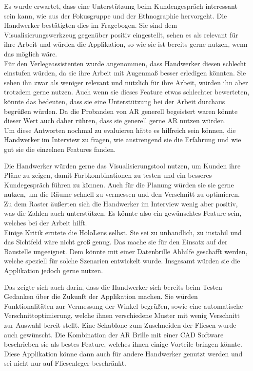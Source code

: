 Es wurde erwartet, dass eine Unterstützung beim Kundengespräch interessant sein kann, wie aus der Fokusgruppe und der Ethnographie hervorgeht. Die Handwerker bestätigten dies im Fragebogen. Sie sind dem Visualisierungswerkzeug gegenüber positiv eingestellt, sehen es als relevant für ihre Arbeit und würden die Applikation, so wie sie ist bereits gerne nutzen, wenn das möglich wäre. \\
Für den Verlegeassistenten wurde angenommen, dass Handwerker diesen schlecht einstufen würden, da sie ihre Arbeit mit Augenmaß besser erledigen könnten. Sie sehen ihn zwar als weniger relevant und nützlich für ihre Arbeit, würden ihn aber trotzdem gerne nutzen. Auch wenn sie dieses Feature etwas schlechter bewerteten, könnte das bedeuten, dass sie eine Unterstützung bei der Arbeit durchaus begrüßen würden. Da die Probanden von AR generell begeistert waren könnte dieser Wert auch daher rühren, dass sie generell gerne AR nutzen würden. \\
Um diese Antworten nochmal zu evaluieren hätte es hilfreich sein können, die Handwerker im Interview zu fragen, wie anstrengend sie die Erfahrung und wie gut sie die einzelnen Features fanden.

Die Handwerker würden gerne das Visualisierungstool nutzen, um Kunden ihre Pläne zu zeigen, damit Farbkombinationen zu testen und ein besseres Kundegespräch führen zu können. Auch für die Planung würden sie sie gerne nutzen, um die Räume schnell zu vermessen und den Verschnitt zu optimieren. Zu dem Raster äußerten sich die Handwerker im Interview wenig aber positiv, was die Zahlen auch unterstützen. Es könnte also ein gewünschtes Feature sein, welches bei der Arbeit hilft. \\
Einige Kritik erntete die HoloLens selbst. Sie sei zu unhandlich, zu instabil und das Sichtfeld wäre nicht groß genug. Das mache sie für den Einsatz auf der Baustelle ungeeignet. Dem könnte mit einer Datenbrille Abhilfe geschafft werden, welche speziell für solche Szenarien entwickelt wurde. Insgesamt würden sie die Applikation jedoch gerne nutzen.

Das zeigte sich auch darin, dass die Handwerker sich bereits beim Testen Gedanken über die Zukunft der Applikation machen. Sie würden Funktionalitäten zur Vermessung der Winkel begrüßen, sowie eine automatische Verschnittoptimierung, welche ihnen verschiedene Muster mit wenig Verschnitt zur Auswahl bereit stellt. Eine Schablone zum Zuschneiden der Fliesen wurde auch gewünscht. Die Kombination der AR Brille mit einer CAD Software beschrieben sie als bestes Feature, welches ihnen einige Vorteile bringen könnte. Diese Applikation könne dann auch für andere Handwerker genutzt werden und sei nicht nur auf Fliesenleger beschränkt.